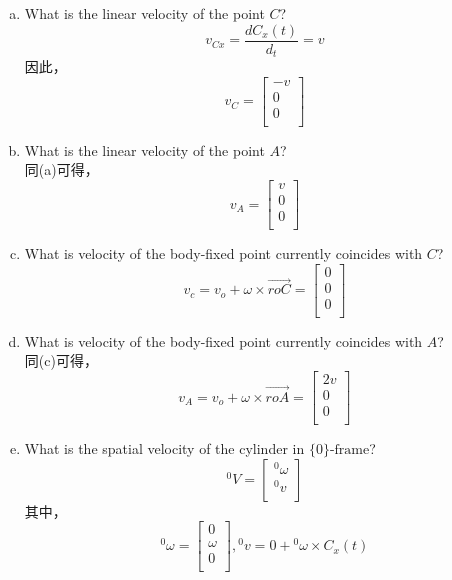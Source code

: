 \begin{enumerate}[(a)]
    \item What is the linear velocity of the point \(C\)?\\
    \[v_{Cx} = \frac{dC_x(t)}{d_t} = v\]
    因此，\[v_C = \begin{bmatrix}
        -v \\ 0 \\ 0 \\
    \end{bmatrix}\]
    \item What is the linear velocity of the point $A$?\\
    同(a)可得，\[v_A = \begin{bmatrix}
        v \\ 0 \\ 0 \\
    \end{bmatrix}\]
    \item What is velocity of the body-fixed point currently coincides with $C$?\\
    \[v_c = v_o + \omega \times \overrightarrow{roC} = \begin{bmatrix}
        0 \\ 0 \\ 0 \\
    \end{bmatrix}\]
    \item What is velocity of the body-fixed point currently coincides with $A$?\\
    同(c)可得，\[v_A = v_o + \omega \times \overrightarrow{roA} = \begin{bmatrix}
        2v \\ 0 \\ 0 \\
    \end{bmatrix}\]
    \item What is the spatial velocity of the cylinder in $\text{\{0\}-frame}$?\\
    \[{}^0V = \begin{bmatrix}
        {}^0\omega \\ {}^0v \\ 
    \end{bmatrix}\]
    其中，\[{}^0\omega = \begin{bmatrix}
        0 \\ \omega \\ 0 \\
    \end{bmatrix}, {}^0v = 0 + {}^0\omega \times  C_x(t)\]

\end{enumerate}
